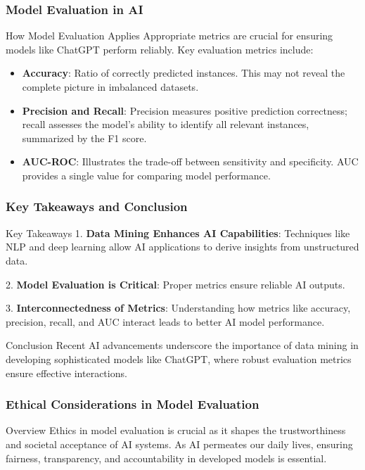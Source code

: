 \documentclass[aspectratio=169]{beamer}
\begin{document}
\begin{frame}[fragile]
  \frametitle{Model Evaluation in AI}
  \begin{block}{How Model Evaluation Applies}
    Appropriate metrics are crucial for ensuring models like ChatGPT perform reliably. Key evaluation metrics include:
    
    \begin{itemize}
      \item \textbf{Accuracy}: 
      Ratio of correctly predicted instances. This may not reveal the complete picture in imbalanced datasets.
      
      \item \textbf{Precision and Recall}: 
      Precision measures positive prediction correctness; recall assesses the model's ability to identify all relevant instances, summarized by the F1 score.
      
      \item \textbf{AUC-ROC}: 
      Illustrates the trade-off between sensitivity and specificity. AUC provides a single value for comparing model performance.
    \end{itemize}
  \end{block}
\end{frame}

\begin{frame}[fragile]
  \frametitle{Key Takeaways and Conclusion}
  \begin{block}{Key Takeaways}
    1. \textbf{Data Mining Enhances AI Capabilities}: 
    Techniques like NLP and deep learning allow AI applications to derive insights from unstructured data.
    
    2. \textbf{Model Evaluation is Critical}: 
    Proper metrics ensure reliable AI outputs.
    
    3. \textbf{Interconnectedness of Metrics}: 
    Understanding how metrics like accuracy, precision, recall, and AUC interact leads to better AI model performance.
  \end{block}

  \begin{block}{Conclusion}
    Recent AI advancements underscore the importance of data mining in developing sophisticated models like ChatGPT, where robust evaluation metrics ensure effective interactions.
  \end{block}
\end{frame}

\begin{frame}[fragile]
  \frametitle{Ethical Considerations in Model Evaluation}
  \begin{block}{Overview}
    Ethics in model evaluation is crucial as it shapes the trustworthiness and societal acceptance of AI systems. As AI permeates our daily lives, ensuring fairness, transparency, and accountability in developed models is essential.
  \end{block}
\end{frame}
\end{document}
